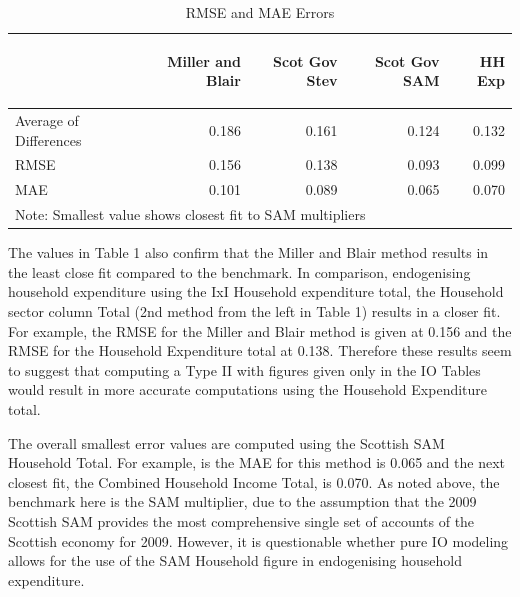 \begin{doublespacing}
\bigskip
\begin{centering}
  \begin{table}[H]
\centering
  \caption{RMSE and MAE Errors}
  \bigskip \begin{scriptsize}  \begin{doublespacing}
  \begin{tabular}{lrrrr}
  \toprule
  &  \begin{sideways}Miller and Blair\end{sideways} & \begin{sideways}Scot Gov Stev\end{sideways} & \begin{sideways}Scot Gov SAM\end{sideways} & \begin{sideways}HH Exp\end{sideways}   \bigstrut[b]\\
  \hline
  Average of Differences &  0.186 & 0.161 & 0.124 & 0.132   \\
  RMSE & 0.156 & 0.138 & 0.093 & 0.099   \\
  MAE & 0.101 & 0.089 & 0.065 & 0.070    \bigstrut[b]\\
  \hline \hline
  \multicolumn{5}{l}{Note: Smallest value shows closest fit to SAM multipliers}
      \end{tabular}%
        \bigskip  \label{tab:4.5.2}
      \end{doublespacing}  \end{scriptsize} \end{table}
      \end{centering}
\bigskip


The values in Table 1 also confirm that the Miller and Blair method results in the least close fit compared to the benchmark. In comparison, endogenising household expenditure using the IxI Household expenditure total, the Household sector column Total (2nd method from the left in Table 1) results in a closer fit. For example, the RMSE for the Miller and Blair method is given at 0.156 and the RMSE for the Household Expenditure total at 0.138. Therefore these results seem to suggest that computing a Type II with figures given only in the IO Tables would result in more accurate computations using the Household Expenditure total. 

\bigskip

The overall smallest error values are computed using the Scottish SAM Household Total. For example, is the MAE for this method is 0.065 and the next closest fit, the Combined Household Income Total, is 0.070. As noted above, the benchmark here is the SAM multiplier, due to the assumption that the 2009 Scottish SAM provides the most comprehensive single set of accounts of the Scottish economy for 2009. However, it is questionable whether pure IO modeling allows for the use of the SAM Household figure in endogenising household expenditure.


\end{doublespacing}
